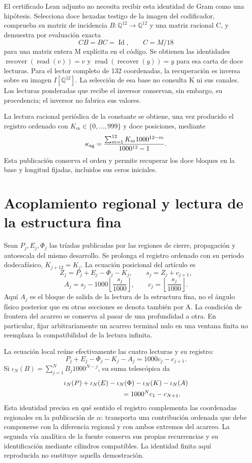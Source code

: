 \documentclass[11pt,a4paper]{article}
\newcommand{\Q}{\mathbb Q}
\begin{document}
El certificado Lean adjunto no necesita recibir esta identidad de Gram
como una hipótesis. Selecciona doce hexadas testigo de la imagen del
codificador, comprueba su matriz de incidencia
$B:\Q^{12}\longrightarrow\Q^{12}$ y una matriz racional C,
y demuestra por evaluación exacta
\[
 CB=BC=\operatorname{Id},\qquad C=M/18
\]
para una matriz entera M explícita en el código. Se obtienen las identidades
$\operatorname{recover}(\operatorname{read}(v))=v$ y
$\operatorname{read}(\operatorname{recover}(y))=y$ para esa carta de doce
lecturas. Para el lector completo de 132 coordenadas, la recuperación es
inversa sobre su imagen $I[\Q^{12}]$. La selección de esa base
no consulta K ni sus canales. Las lecturas ponderadas que recibe el inversor
conservan, sin embargo, su procedencia; el inversor no fabrica sus valores.

La lectura racional periódica de la constante se obtiene, una vez producido
el registro ordenado con $K_m\in\{0,\ldots,999\}$ y doce posiciones, mediante
\[
 \kappa_{\rm ag}=\frac{\sum_{m=1}^{12}K_m1000^{12-m}}{1000^{12}-1}.
\]
Esta publicación conserva el orden y permite recuperar los doce bloques en
la base y longitud fijadas, incluidos sus ceros iniciales.

\section{Acoplamiento regional y lectura de la estructura fina}

Sean $P_j,E_j,\Phi_j$ las tríadas publicadas por las regiones de cierre,
propagación y autoescala del mismo desarrollo. Se prolonga el registro
ordenado con su periodo dodecafásico, $K_{j+12}=K_j$. La ecuación posicional
del artículo es
\[
 Z_j=P_j+E_j-\Phi_j-K_j,\qquad s_j=Z_j+c_{j+1},
\]
\[
 A_j=s_j-1000\left\lfloor\frac{s_j}{1000}\right\rfloor,
 \qquad c_j=\left\lfloor\frac{s_j}{1000}\right\rfloor.
\]
Aquí $A_j$ es el bloque de salida de la lectura de la estructura fina,
no el ángulo físico posterior que en otras secciones se denota también
por A. La condición de frontera del acarreo se conserva al pasar de una
profundidad a otra. En particular, fijar arbitrariamente un acarreo terminal
nulo en una ventana finita no reemplaza la compatibilidad de la lectura
infinita.

La ecuación local reúne efectivamente las cuatro lecturas y su registro:
\[
 \boxed{P_j+E_j-\Phi_j-K_j-A_j=1000c_j-c_{j+1}.}
\]
Si $\iota_N(B)=\sum_{j=1}^{N} B_j1000^{N-j}$, su suma telescópica da
\[
\begin{aligned}
 &\iota_N(P)+\iota_N(E)-\iota_N(\Phi)-\iota_N(K)-\iota_N(A)\\
 &\hspace{30mm}=1000^Nc_1-c_{N+1}.
\end{aligned}
\]
Esta identidad precisa en qué sentido el registro complementa las
coordenadas regionales en la publicación de $\alpha$: transporta una
contribución ordenada que debe componerse con la diferencia regional y con
ambos extremos del acarreo. La segunda vía analítica de la fuente conserva
sus propias recurrencias y su identificación mediante cilindros compatibles.
La identidad finita aquí reproducida no sustituye aquella demostración.
\end{document}
